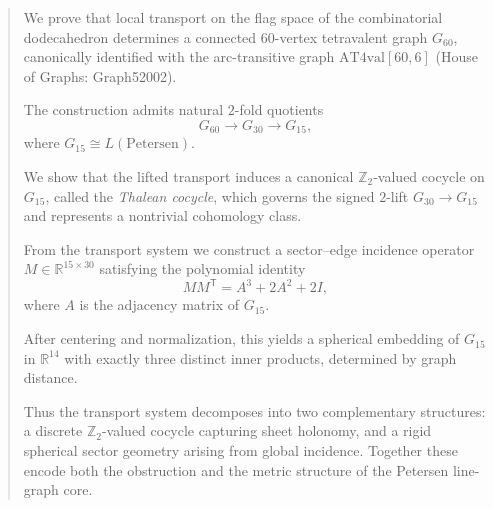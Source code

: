 \begin{abstract}
We prove that local transport on the flag space of the combinatorial
dodecahedron determines a connected $60$-vertex tetravalent graph
$G_{60}$, canonically identified with the arc-transitive graph
$\mathrm{AT4val}[60,6]$ (House of Graphs: Graph52002).

The construction admits natural $2$-fold quotients
\[
G_{60} \to G_{30} \to G_{15},
\]
where $G_{15} \cong L(\mathrm{Petersen})$.

We show that the lifted transport induces a canonical
$\mathbb{Z}_2$-valued cocycle on $G_{15}$, called the
\emph{Thalean cocycle}, which governs the signed $2$-lift
$G_{30} \to G_{15}$ and represents a nontrivial cohomology class.

From the transport system we construct a sector--edge incidence operator
$M \in \mathbb{R}^{15 \times 30}$ satisfying the polynomial identity
\[
M M^{\mathsf T} = A^3 + 2A^2 + 2I,
\]
where $A$ is the adjacency matrix of $G_{15}$.

After centering and normalization, this yields a spherical embedding of
$G_{15}$ in $\mathbb{R}^{14}$ with exactly three distinct inner products,
determined by graph distance.

Thus the transport system decomposes into two complementary structures:
a discrete $\mathbb{Z}_2$-valued cocycle capturing sheet holonomy, and a
rigid spherical sector geometry arising from global incidence. Together
these encode both the obstruction and the metric structure of the
Petersen line-graph core.
\end{abstract}
